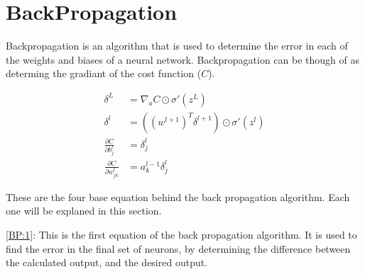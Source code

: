\documentclass{subfile}
\begin{document}
\section{BackPropagation}
\begin{multicols}{2}
  Backpropagation is an algorithm that is used to determine the error in each of the weights and biases of a neural network. Backpropagation can be though of as determing the gradiant of the cost function ($C$).
\end{multicols}
\begin{align}
  \delta^{L} &= \nabla_{a}C\odot\sigma'\left(z^{L}\right)\label{BP:1}\\
  \delta^{l} &= \left( {\left( w^{l+1} \right)}^{T} \delta^{l+1} \right) \odot \sigma' \left( z^{l} \right)\label{BP:2}\\
  \frac{\partial C}{\partial b^{l}_{j}} &= \delta^{l}_{j}\label{BP:3}\\
  \frac{\partial C}{\partial w^{l}_{jk}} &= a^{l-1}_{k}\delta^{l}_{j}\label{BP:4}
\end{align}
\begin{multicols}{2}
  These are the four base equation behind the back propagation algorithm. Each one will be explaned in this section.
  \par
  \eqref{BP:1}: This is the first equation of the back propagation algorithm. It is used to find the error in the final set of neurons, by determining the difference between the calculated output, and the desired output.
\end{multicols}
\end{document}
